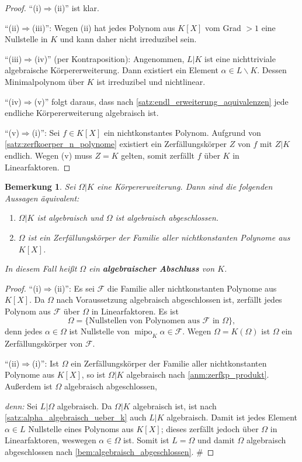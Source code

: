 \documentclass[a4paper, twoside, 11pt, ngerman]{report}
\newcommand{\calF}{\mathcal F}
\renewcommand{\setminus}{\smallsetminus}
\DeclareMathOperator{\mipo}{mipo}
\theoremstyle{definistyle}
\newtheorem{bem}[satz]{Bemerkung}
\theoremstyle{remark}
\newenvironment{denn}%
  {\par\textit{denn:}}%
  {\hfill\#\par}
\newcommand{\defn}[1]{\textit{\bfseries #1}}
\begin{document}
\begin{proof}
"`(i)$\Rightarrow$(ii)"' ist klar.

"`(ii)$\Rightarrow$(iii)"':  
Wegen (ii) hat jedes Polynom aus $K[X]$ vom Grad $>1$ eine Nullstelle in $K$ und kann daher nicht irreduzibel sein.  

"`(iii)$\Rightarrow$(iv)"' (per Kontraposition):  
Angenommen, $L|K$ ist eine nichttriviale algebraische Körpererweiterung.  
Dann existiert ein Element $\alpha \in L \setminus K$. Dessen Minimalpolynom über $K$ ist irreduzibel und nichtlinear.

"`(iv)$\Rightarrow$(v)"' folgt daraus, dass nach \ref{satz:endl_erweiterung_aquivalenzen} jede endliche Körpererweiterung algebraisch ist.

"`(v)$\Rightarrow$(i)"': 
Sei $f \in K[X]$ ein nichtkonstantes Polynom. Aufgrund von \ref{satz:zerfkoerper_n_polynome} existiert ein Zerfällungskörper $Z$ von $f$ mit $Z|K$ endlich.  
Wegen (v) muss $Z = K$ gelten, somit zerfällt $f$ über $K$ in Linearfaktoren.
\end{proof}


\begin{bem}\label{bem:algebraischer_abschluss}
Sei $\Omega|K$ eine Körpererweiterung. Dann sind die folgenden Aussagen äquivalent:
\begin{enumerate}[label=(\roman*)]
\item $\Omega|K$ ist algebraisch und $\Omega$ ist algebraisch abgeschlossen.
\item $\Omega$ ist ein Zerfällungskörper der Familie aller nichtkonstanten Polynome aus $K[X]$.
\end{enumerate}
In diesem Fall heißt $\Omega$ ein \defn{algebraischer Abschluss} von $K$.
\end{bem}

\begin{proof}
"`(i)$\Rightarrow$(ii)"': Es sei $\calF$ die Familie aller nichtkonstanten Polynome aus
$K[X]$. Da $\Omega$ nach Voraussetzung algebraisch abgeschlossen ist, zerfällt jedes Polynom aus $\calF$ über $\Omega$ in Linearfaktoren. Es ist
\[
\Omega=\{\text{Nullstellen von Polynomen aus }\calF\text{ in }\Omega\}, 
\]
denn jedes $\alpha\in\Omega$ ist Nullstelle von $\mipo_K\alpha\in\calF$.
Wegen $\Omega=K(\Omega)$ ist $\Omega$ ein Zerfällungskörper von $\calF$.

"`(ii)$\Rightarrow$(i)"':  
Ist $\Omega$ ein Zerfällungskörper der Familie aller nichtkonstanten Polynome aus $K[X]$, so ist $\Omega|K$ algebraisch nach \ref{anm:zerfkp_produkt}.
Außerdem ist $\Omega$ algebraisch abgeschlossen,
\begin{denn}
Sei $L|\Omega$ algebraisch. Da $\Omega|K$ algebraisch ist, ist nach \ref{satz:alpha_algebraisch_ueber_k} auch $L|K$ algebraisch.
Damit ist jedes Element $\alpha\in L$ Nullstelle eines Polynoms aus $K[X]$; dieses zerfällt jedoch über $\Omega$ in Linearfaktoren, weswegen $\alpha\in\Omega$ ist. Somit ist $L=\Omega$ und damit $\Omega$ algebraisch abgeschlossen nach \ref{bem:algebraisch_abgeschlossen}.
\end{denn}
\end{proof}
\end{document}
